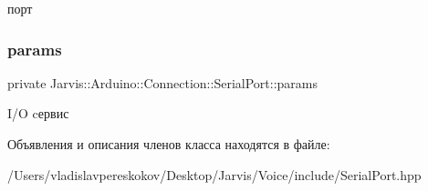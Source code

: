 порт \mbox{\label{classJarvis_1_1Arduino_1_1Connection_1_1SerialPort_ae94ab8cb0505cd48431c8a013eeb9c26}} 
\subsubsection{\texorpdfstring{params}{params}}
{\footnotesize\ttfamily private Jarvis\+::\+Arduino\+::\+Connection\+::\+Serial\+Port\+::params}

I/O cервис 

Объявления и описания членов класса находятся в файле\+:\begin{DoxyCompactItemize}
\item 
/\+Users/vladislavpereskokov/\+Desktop/\+Jarvis/\+Voice/include/Serial\+Port.\+hpp\end{DoxyCompactItemize}
